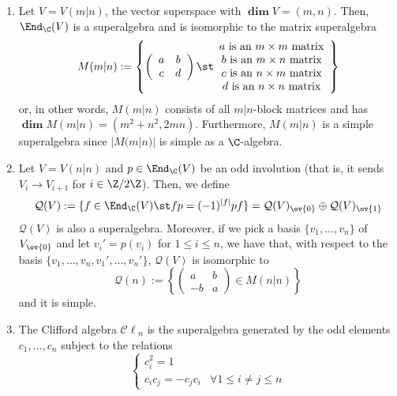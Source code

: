 \documentclass[11pt,leqno,oneside]{amsbook}
\newcommand{\grdim}{\boldsymbol{\dim}}
\renewcommand{\Q}{\mathcal{Q}}
\newcommand{\Cl}{\mathcal{C\ell}}
\numberwithin{thm}{section}
\begin{document}
\begin{example}
  \begin{enumerate}
  \item Let \(V = V(m|n)\), the vector superspace with \(\grdim V =
    (m,n)\). Then, \(\End_\C(V)\) is a superalgebra and is isomorphic
    to the matrix superalgebra \[
      M(m|n) := \left\{ \left(
          \begin{array}{cc}
            a&b\\
            c&d
          \end{array}
\right) \st
\begin{array}{c}
  a \text{ is an }m \times m \text{ matrix}\\
  b \text{ is an }m \times n \text{ matrix}\\
  c \text{ is an }n \times m \text{ matrix}\\
  d \text{ is an }n \times n \text{ matrix}
\end{array}
\right\}
\]
or, in other words, \(M(m|n)\) consists of all \(m|n\)-block matrices
and has \(\grdim M(m|n) = (m^2+n^2, 2mn)\). Furthermore, \(M(m|n)\) is
a simple superalgebra since \(|M(m|n)|\) is simple as a \(\C\)-algebra.
\item Let \(V = V(n|n)\) and \(p \in \End_\C(V)\) be an odd involution
  (that is, it sends \(V_i \to V_{i+1}\) for \(i \in \Z/2\Z\)). Then,
  we define \[
    \Q(V) := \{f \in \End_\C(V) \st fp = (-1)^{|f|}pf\} =
    \Q(V)_{\ov{0}} \oplus \Q(V)_{\ov{1}}
  \]
  \(\Q(V)\) is also a superalgebra. Moreover, if we pick a basis
  \(\{v_1, \ldots, v_n\}\) of \(V_{\ov{0}}\) and let \(v_i' = p(v_i)\)
  for \(1 \leq i \leq n\), we have that, with respect to the basis
  \(\{v_1, \ldots, v_n, v_1', \ldots, v_n'\}\), \(\Q(V)\) is
  isomorphic to \[
    \Q(n) := \left\{ \left(
        \begin{array}{cc}
          a&b\\
          -b&a
        \end{array}
      \right) \in M(n|n) \right\}
  \]
  and it is simple.
  \item The Clifford algebra \(\Cl_n\) is the superalgebra generated
    by the odd elements \(c_1, \ldots, c_n\) subject to the
    relations \[
      \begin{cases}
        c_i^2 = 1\\
        c_i c_j = - c_j c_i & \forall 1 \leq i \neq j \leq n
      \end{cases}
    \]
  \end{enumerate}
\end{example}
\end{document}

